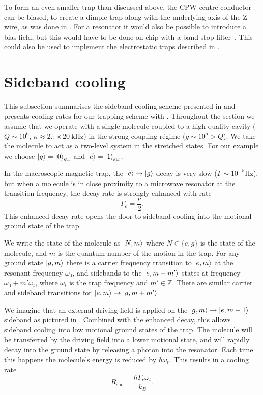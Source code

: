 To form an even smaller trap than discussed above, the CPW centre conductor can
be biased, to create a dimple trap along with the underlying axis of the
Z-wire, as was done in . For a resonator it would also
be possible to introduce a bias field, but this would have to be done on-chip
with a band stop filter~\cite{doi:10.1063/1.4808364}. This could also be used
to implement the electrostatic traps described in .

\section{Sideband cooling}

This subsection summarises the sideband cooling scheme presented in
 and presents cooling rates for our trapping scheme with
\CaF{}.  Throughout the section we assume that we operate with a single molecule
coupled to a high-quality cavity ($Q\sim10^6$, $\kappa \approx 2\pi\times
\SI{20}{\kilo\hertz}$) in the strong coupling r\'egime ($g\sim10^5>Q$). We take
the molecule to act as a two-level system in the stretched states.
For our example we choose $\ket{g}=\ket{0}_\text{str}$ and
$\ket{e}=\ket{1}_\text{str}$.

In the macroscopic magnetic trap, the
$\ket{e}\rightarrow\ket{g}$ decay is very slow ($\Gamma \sim
10^{-5}\si{\hertz}$), but when a molecule is in close proximity to a microwave
resonator at the transition frequency, the decay rate is strongly enhanced
with rate
%
\begin{equation}
  \Gamma_c = \frac{\kappa}{2}.
\end{equation}
%
This enhanced decay rate opens the door to sideband cooling into the motional
ground state of the trap.

We write the state of the molecule as $\ket{N, m}$ where $N\in\{e,g\}$ is the
state of the molecule, and $m$ is the quantum number of the motion
in the trap. For any ground state $\ket{g,m}$ there is a carrier frequency
transition to $\ket{e, m}$ at the resonant frequency $\omega_0$, and sidebands
to the $\ket{e, m+m'}$ states at frequency $\omega_0 + m'\omega_t$, where
$\omega_t$ is the trap frequency and $m'\in \mathbb{Z}$. There are similar
carrier and sideband transitions for $\ket{e,m} \rightarrow \ket{g, m+m'}$.

We imagine that an external driving field is applied on the
$\ket{g, m} \rightarrow \ket{e, m-1}$ sideband as pictured in
. Combined with the enhanced decay, this allows
sideband cooling into low motional ground states of the trap. The molecule will
be transferred by the driving field into a lower motional state, and will
rapidly decay into the ground state by releasing a photon into the resonator.
Each time this happens the molecule's energy is reduced by $\hbar\omega_t$.
This results in a cooling rate
%
\begin{equation}
  R_\text{sbc} = \frac{\hbar\Gamma_c\omega_t}{k_B}.
\end{equation}


